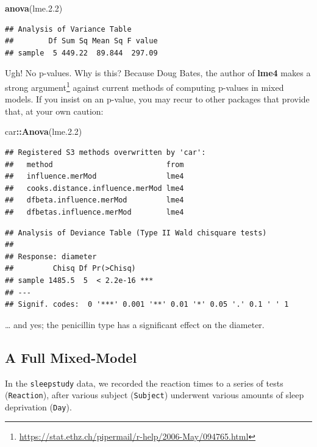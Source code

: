 \documentclass[]{book}
\newenvironment{Shaded}{\begin{snugshade}}{\end{snugshade}}
\newcommand{\FloatTok}[1]{\textcolor[rgb]{0.00,0.00,0.81}{#1}}
\newcommand{\KeywordTok}[1]{\textcolor[rgb]{0.13,0.29,0.53}{\textbf{#1}}}
\newcommand{\NormalTok}[1]{#1}
\newcommand{\OperatorTok}[1]{\textcolor[rgb]{0.81,0.36,0.00}{\textbf{#1}}}
\renewcommand{\href}[2]{#2\footnote{\url{#1}}}
\theoremstyle{definition}
\theoremstyle{definition}
\theoremstyle{definition}
\theoremstyle{remark}
\begin{document}
\begin{Shaded}
\begin{Highlighting}[]
\KeywordTok{anova}\NormalTok{(lme.}\FloatTok{2.2}\NormalTok{)}
\end{Highlighting}
\end{Shaded}

\begin{verbatim}
## Analysis of Variance Table
##        Df Sum Sq Mean Sq F value
## sample  5 449.22  89.844  297.09
\end{verbatim}

Ugh! No p-values. Why is this? Because Doug Bates, the author of \textbf{lme4} makes a \href{https://stat.ethz.ch/pipermail/r-help/2006-May/094765.html}{strong argument} against current methods of computing p-values in mixed models. If you insist on an p-value, you may recur to other packages that provide that, at your own caution:

\begin{Shaded}
\begin{Highlighting}[]
\NormalTok{car}\OperatorTok{::}\KeywordTok{Anova}\NormalTok{(lme.}\FloatTok{2.2}\NormalTok{) }
\end{Highlighting}
\end{Shaded}

\begin{verbatim}
## Registered S3 methods overwritten by 'car':
##   method                          from
##   influence.merMod                lme4
##   cooks.distance.influence.merMod lme4
##   dfbeta.influence.merMod         lme4
##   dfbetas.influence.merMod        lme4
\end{verbatim}

\begin{verbatim}
## Analysis of Deviance Table (Type II Wald chisquare tests)
## 
## Response: diameter
##         Chisq Df Pr(>Chisq)    
## sample 1485.5  5  < 2.2e-16 ***
## ---
## Signif. codes:  0 '***' 0.001 '**' 0.01 '*' 0.05 '.' 0.1 ' ' 1
\end{verbatim}

\ldots{} and yes; the penicillin type has a significant effect on the diameter.

\hypertarget{a-full-mixed-model}{%
\subsection{A Full Mixed-Model}\label{a-full-mixed-model}}

In the \texttt{sleepstudy} data, we recorded the reaction times to a series of tests (\texttt{Reaction}), after various subject (\texttt{Subject}) underwent various amounts of sleep deprivation (\texttt{Day}).
\end{document}
